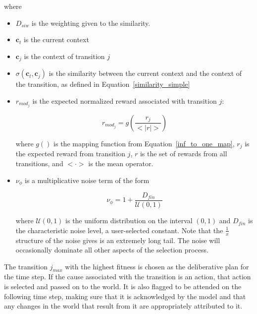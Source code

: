 where
\begin{itemize}
\item $D_{siw}$ is the weighting given to the similarity. 
\item $\mathbf{c}_t$ is the current context
\item $\mathbf{c}_j$ is the context of transition $j$
\item $\sigma(\mathbf{c}_t,\mathbf{c}_j) $ is the similarity between the current context and the context of the transition, as defined in Equation~\ref{similarity_simple}
\item $r_{mod_j}$ is the expected normalized reward associated with transition $j$:

\begin{equation}
r_{mod_j} = g \left ( \frac{r_j}{<|r|>} \right )
\end{equation}

where $g()$ is the mapping function from Equation~\ref{inf_to_one_map}, $r_j$ is the expected reward from transition $j$, $r$ is the set of rewards from all transitions, and $< \cdot >$ is the mean operator.

\item $\nu_\phi$ is a multiplicative noise term of the form

\begin{equation}
\nu_\phi = 1 + \frac{D_{fin} }{ \mathcal{U}(0,1)}
\end{equation}

where $ \mathcal{U}(0,1)$ is the uniform distribution on the interval $(0,1)$ and $D_{fin}$ is the characteristic noise level, a user-selected constant. Note that the $\frac{1}{x}$ structure of the noise gives is an extremely long tail. The noise will occasionally dominate all other aspects of the selection process.


\end{itemize}

The transition $j_{max}$ with the highest fitness is chosen as the deliberative plan for the time step. If the cause associated with the transition is an action, that action is selected and passed on to the world. It is also flagged to be attended on the following time step, making sure that it is acknowledged by the model and that any changes in the world that result from it are appropriately attributed to it.

